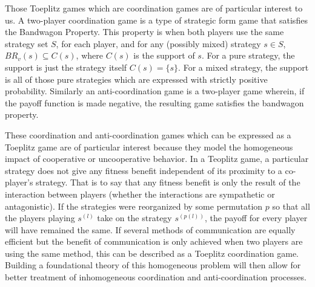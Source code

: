 \documentclass[aps,
preprint,
groupedaddress,
showkeys,
amsmath]{revtex4-2}
\begin{document}
Those Toeplitz games which are coordination games are of particular interest to us. A two-player coordination game is a type of strategic form game that satisfies the Bandwagon Property\cite{Kandori1998}. This property is when both players use the same strategy set $S$, for each player, and for any (possibly mixed) strategy $s\in S$, $BR_v(s)\subseteq C(s)$, where $C(s)$ is the support of $s$. For a pure strategy, the support is just the strategy itself $C(s)=\{s\}$. For a mixed strategy, the support is all of those pure strategies which are expressed with strictly positive probability. Similarly an anti-coordination game is a two-player game wherein, if the payoff function is made negative, the resulting game satisfies the bandwagon property. 

These coordination and anti-coordination games which can be expressed as a Toeplitz game are of particular interest because they model the homogeneous impact of cooperative or uncooperative behavior. In a Teoplitz game, a particular strategy does not give any fitness benefit independent of its proximity to a co-player's strategy. That is to say that any fitness benefit is only the result of the interaction between players (whether the interactions are sympathetic or antagonistic). If the strategies were reorganized by some permutation $p$ so that all the players playing $s^{(l)}$ take on the strategy $s^{(p(l))}$, the payoff for every player will have remained the same. If several methods of communication are equally efficient but the benefit of communication is only achieved when two players are using the same method, this can be described as a Toeplitz coordination game. Building a foundational theory of this homogeneous problem will then allow for better treatment of inhomogeneous coordination and anti-coordination processes.
\end{document}
